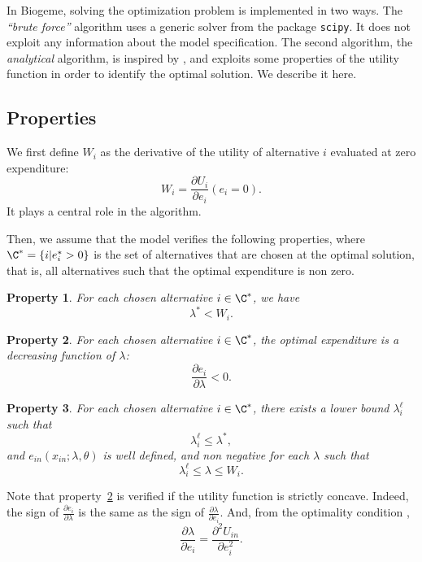 \documentclass[12pt,a4paper]{article}
\newtheorem{property}{Property}
\begin{document}
In Biogeme, solving the optimization problem is implemented in two ways. The \emph{``brute force''} algorithm
    uses a generic solver from the package \texttt{scipy}. It does not exploit any information about the model specification.
The second algorithm, the \emph{analytical} algorithm, is inspired by  , and exploits some properties of the
utility function in order to identify the optimal solution. We describe it here.

\subsection{Properties}
We first define $W_i$ as the
derivative of the utility of alternative $i$ evaluated at zero expenditure:
\begin{equation}
    W_i = \frac{\partial U_i}{\partial e_i}(e_i = 0).
\end{equation}
It plays a central role in the algorithm.

Then, we assume that the model verifies
the following properties, where $\C^* = \{i | e_i^* > 0 \}$ is the set of alternatives that are chosen at the optimal
solution, that is, all alternatives such that the optimal expenditure is non zero.



\begin{property}
    \label{prop:one}
    For each chosen alternative $i \in \C^*$, we have
    \[
        \lambda^* < W_i.
    \]
\end{property}
\begin{property}
    \label{prop:two}
    For each chosen alternative $i\in\C^*$, the optimal expenditure  is a decreasing function of $\lambda$:
    \[
        \frac{\partial e_i}{\partial \lambda} < 0.
    \]
    \end{property}
\begin{property}
    \label{prop:three}
    For each chosen alternative $i\in\C^*$, there exists  a lower bound $\lambda^\ell_i$ such that
    \[
            \lambda^\ell_i \leq \lambda^*,
    \]
    and $e_{in}(x_{in}; \lambda, \theta)$ is well defined, and non negative for each $\lambda$ such that
    \[
        \lambda^\ell_i \leq \lambda \leq W_i.
    \]
\end{property}

Note that property~\ref{prop:two} is verified if the utility function is strictly concave. Indeed, the sign of $\frac{\partial e_i}{\partial \lambda}$ is the same as the sign
of $\frac{\partial \lambda}{\partial e_i}$. And, from the optimality condition ,
\[
    \frac{\partial \lambda}{\partial e_i} = \frac{\partial^2 U_{in}}{\partial e_i^2}.
\]
\end{document}
